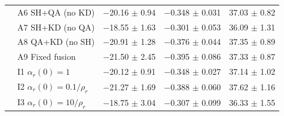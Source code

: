 \begin{table}[!t]
\begin{tabular}{llrrr}
 & A6 SH+QA (no KD) & $-$20.16 $\pm$ 0.94 & $-$0.348 $\pm$ 0.031 & 37.03 $\pm$ 0.82 \\
 & A7 SH+KD (no QA) & $-$18.55 $\pm$ 1.63 & $-$0.301 $\pm$ 0.053 & 36.09 $\pm$ 1.31 \\
 & A8 QA+KD (no SH) & $-$20.91 $\pm$ 1.28 & $-$0.376 $\pm$ 0.044 & 37.35 $\pm$ 0.89 \\
 & A9 Fixed fusion & $-$21.50 $\pm$ 2.45 & $-$0.395 $\pm$ 0.086 & 37.33 $\pm$ 0.87 \\
 & I1 $\alpha_r(0)=1$ & $-$20.12 $\pm$ 0.91 & $-$0.348 $\pm$ 0.027 & 37.14 $\pm$ 1.02 \\
 & I2 $\alpha_r(0)=0.1/\rho_r$ & $-$21.27 $\pm$ 1.69 & $-$0.388 $\pm$ 0.060 & 37.62 $\pm$ 1.16 \\
 & I3 $\alpha_r(0)=10/\rho_r$ & $-$18.75 $\pm$ 3.04 & $-$0.307 $\pm$ 0.099 & 36.33 $\pm$ 1.55 \\
\bottomrule
\end{tabular}\end{table}